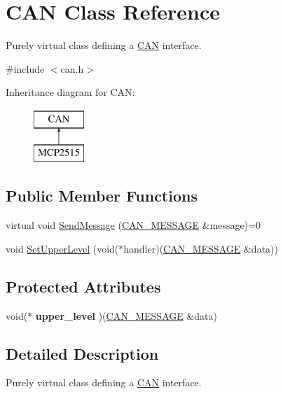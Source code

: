 \hypertarget{class_c_a_n}{}\section{C\+AN Class Reference}
\label{class_c_a_n}


Purely virtual class defining a \hyperlink{class_c_a_n}{C\+AN} interface.  




{\ttfamily \#include $<$can.\+h$>$}

Inheritance diagram for C\+AN\+:\begin{figure}[H]
\begin{center}
\leavevmode
\includegraphics[height=2.000000cm]{class_c_a_n}
\end{center}
\end{figure}
\subsection*{Public Member Functions}
\begin{DoxyCompactItemize}
\item 
virtual void \hyperlink{class_c_a_n_a9149d0118ae9de4a8dc0b807f7c34b1a}{Send\+Message} (\hyperlink{struct_c_a_n___m_e_s_s_a_g_e}{C\+A\+N\+\_\+\+M\+E\+S\+S\+A\+GE} \&message)=0
\item 
void \hyperlink{class_c_a_n_ac68e0152514d39c43e9406b19031af89}{Set\+Upper\+Level} (void($\ast$handler)(\hyperlink{struct_c_a_n___m_e_s_s_a_g_e}{C\+A\+N\+\_\+\+M\+E\+S\+S\+A\+GE} \&data))
\end{DoxyCompactItemize}
\subsection*{Protected Attributes}
\begin{DoxyCompactItemize}
\item 
\hypertarget{class_c_a_n_aef38b61b368e80233ef211473ac51035}{}\label{class_c_a_n_aef38b61b368e80233ef211473ac51035} 
void($\ast$ {\bfseries upper\+\_\+level} )(\hyperlink{struct_c_a_n___m_e_s_s_a_g_e}{C\+A\+N\+\_\+\+M\+E\+S\+S\+A\+GE} \&data)
\end{DoxyCompactItemize}


\subsection{Detailed Description}
Purely virtual class defining a \hyperlink{class_c_a_n}{C\+AN} interface. 

